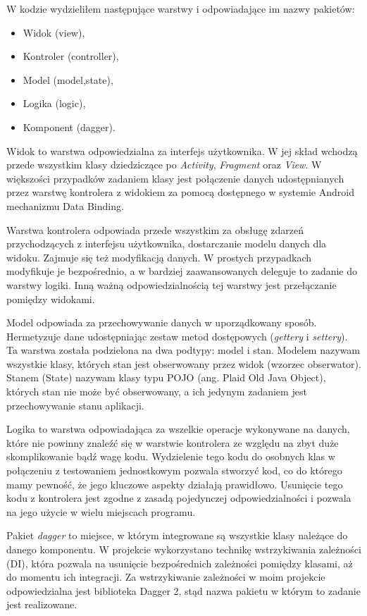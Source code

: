 \documentclass[openright]{xmgr}
\begin{document}
W kodzie wydzieliłem następujące warstwy i odpowiadające im nazwy pakietów:
\begin{itemize}
	\item Widok (view),
	\item Kontroler (controller),
	\item Model (model,state),
	\item Logika (logic),
	\item Komponent (dagger).
\end{itemize}

Widok to warstwa odpowiedzialna za interfejs użytkownika. W jej skład wchodzą przede wszystkim klasy dziedziczące po \textit{Activity}, \textit{Fragment} oraz \textit{View}. W większości przypadków zadaniem klasy jest połączenie danych udostępnianych przez warstwę kontrolera z widokiem za pomocą dostępnego w systemie Android mechanizmu Data Binding\cite{AndroidSDK:2017:Doc}.

Warstwa kontrolera odpowiada przede wszystkim za obsługę zdarzeń przychodzących z interfejsu użytkownika, dostarczanie modelu danych dla widoku. Zajmuje się też modyfikacją danych. W prostych przypadkach modyfikuje je bezpośrednio, a w bardziej zaawansowanych deleguje to zadanie do warstwy logiki. Inną ważną odpowiedzialnością tej warstwy jest przełączanie pomiędzy widokami. 

Model odpowiada za przechowywanie danych w uporządkowany sposób. Hermetyzuje dane udostępniając zestaw metod dostępowych (\textit{gettery} i \textit{settery}). Ta warstwa została podzielona na dwa podtypy: model i stan. Modelem nazywam wszystkie klasy, których stan jest obserwowany przez widok (wzorzec obserwator). Stanem (State) nazywam klasy typu POJO (ang. Plaid Old Java Object), których stan nie może być obserwowany, a ich jedynym zadaniem jest przechowywanie stanu aplikacji. 

Logika to warstwa odpowiadająca za wszelkie operacje wykonywane na danych, które nie powinny znaleźć się w warstwie kontrolera ze względu na zbyt duże skomplikowanie bądź wagę kodu. Wydzielenie tego kodu do osobnych klas w połączeniu z testowaniem jednostkowym pozwala stworzyć kod, co do którego mamy pewność, że jego kluczowe aspekty działają prawidłowo. Usunięcie tego kodu z kontrolera jest zgodne z zasadą pojedynczej odpowiedzialności \cite{CleanCode:2005} i pozwala na jego użycie w wielu miejscach programu. 

Pakiet \textit{dagger} to miejsce, w którym integrowane są wszystkie klasy należące do danego komponentu. W projekcie wykorzystano technikę wstrzykiwania zależności (DI), która pozwala na usunięcie bezpośrednich zależności pomiędzy klasami, aż do momentu ich integracji. Za wstrzykiwanie zależności w moim projekcie odpowiedzialna jest biblioteka Dagger 2, stąd nazwa pakietu w którym to zadanie jest realizowane.
\end{document}
